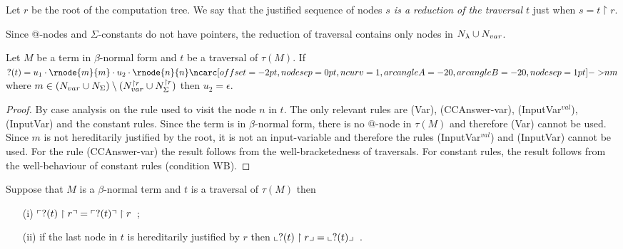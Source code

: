\begin{dfn}
Let $r$ be the root of the computation tree. We say that the
justified sequence of nodes \emph{$s$ is a reduction of the
traversal $t$} just when $s = t \upharpoonright r$.
\end{dfn}

Since @-nodes and $\Sigma$-constants do not have pointers, the
reduction of traversal contains only nodes in $N_\lambda \cup
N_{var}$.


\begin{lem}
\label{lem:var_followedby_child} Let $M$ be a term in $\beta$-normal
form and $t$ be a traversal of $\tau(M)$. If $?(t) = u_1 \cdot
\rnode{m}{m} \cdot u_2 \cdot \rnode{n}{n}
\link[nodesep=1pt]{20}{n}{m}$ where $m \in (N_{var} \cup N_{\Sigma}) \setminus (N^{\upharpoonright r}_{var} \cup N^{\upharpoonright r}_{\Sigma})$
then $u_2 = \epsilon$.
\end{lem}
\begin{proof}
By case analysis on the rule used to visit the node
$n$ in $t$. The only relevant rules are (Var), (CCAnswer-var), (InputVar$^{val}$), (InputVar)
and the constant rules.
Since the term is in $\beta$-normal form, there is no @-node in $\tau(M)$ and therefore (Var) cannot be used.
Since $m$ is not hereditarily justified by the root, it is not an input-variable and therefore the rules
(InputVar$^{val}$) and (InputVar) cannot be used.
For the rule (CCAnswer-var) the result follows from the well-bracketedness of traversals.
For constant rules, the result follows from the well-behaviour of constant rules (condition WB).
\end{proof}

\begin{lem}
\label{lem:redtrav_trav} Suppose that $M$ is a $\beta$-normal term and $t$ is a traversal of $\tau(M)$ then
\begin{itemize}
\item[(i)] $ \ulcorner ?(t) \upharpoonright  r  \urcorner = \ulcorner ?(t) \urcorner \upharpoonright r$\ ;
\item[(ii)] if the last node in $t$ is hereditarily justified by $r$ then $ \llcorner ?(t) \upharpoonright r  \lrcorner = \llcorner ?(t) \lrcorner$\ .
\end{itemize}
\end{lem}

